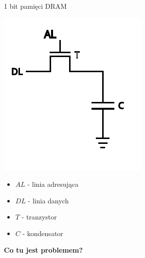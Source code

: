 \documentclass{beamer}
\begin{document}
\begin{frame}{1 bit pamięci DRAM}
  \begin{minipage}{0.5\textwidth}
    \includegraphics[scale=1]{assets/DRAM_bit.pdf}
  \end{minipage}%
  \begin{minipage}{0.5\textwidth}
  	\begin{itemize}
  		\item $AL$ - linia adresująca
  		\item $DL$ - linia danych
  		\item $T$ - tranzystor
  		\item $C$ - kondensator
  	\end{itemize}
  	\pause
  	\centering
  	\vspace{20px}
  	\textbf{Co tu jest problemem?}
    
  \end{minipage}
\end{frame}
\end{document}
